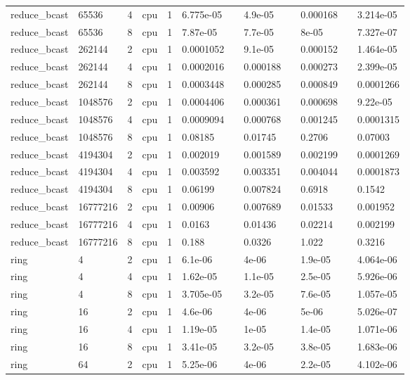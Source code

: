 \begin{tabular}{llllllllllll}
reduce\_bcast & 65536 & 4 & cpu & 1 & 6.775e-05 &  & 4.9e-05 &  & 0.000168 &  & 3.214e-05 \\
reduce\_bcast & 65536 & 8 & cpu & 1 & 7.87e-05 &  & 7.7e-05 &  & 8e-05 &  & 7.327e-07 \\
reduce\_bcast & 262144 & 2 & cpu & 1 & 0.0001052 &  & 9.1e-05 &  & 0.000152 &  & 1.464e-05 \\
reduce\_bcast & 262144 & 4 & cpu & 1 & 0.0002016 &  & 0.000188 &  & 0.000273 &  & 2.399e-05 \\
reduce\_bcast & 262144 & 8 & cpu & 1 & 0.0003448 &  & 0.000285 &  & 0.000849 &  & 0.0001266 \\
reduce\_bcast & 1048576 & 2 & cpu & 1 & 0.0004406 &  & 0.000361 &  & 0.000698 &  & 9.22e-05 \\
reduce\_bcast & 1048576 & 4 & cpu & 1 & 0.0009094 &  & 0.000768 &  & 0.001245 &  & 0.0001315 \\
reduce\_bcast & 1048576 & 8 & cpu & 1 & 0.08185 &  & 0.01745 &  & 0.2706 &  & 0.07003 \\
reduce\_bcast & 4194304 & 2 & cpu & 1 & 0.002019 &  & 0.001589 &  & 0.002199 &  & 0.0001269 \\
reduce\_bcast & 4194304 & 4 & cpu & 1 & 0.003592 &  & 0.003351 &  & 0.004044 &  & 0.0001873 \\
reduce\_bcast & 4194304 & 8 & cpu & 1 & 0.06199 &  & 0.007824 &  & 0.6918 &  & 0.1542 \\
reduce\_bcast & 16777216 & 2 & cpu & 1 & 0.00906 &  & 0.007689 &  & 0.01533 &  & 0.001952 \\
reduce\_bcast & 16777216 & 4 & cpu & 1 & 0.0163 &  & 0.01436 &  & 0.02214 &  & 0.002199 \\
reduce\_bcast & 16777216 & 8 & cpu & 1 & 0.188 &  & 0.0326 &  & 1.022 &  & 0.3216 \\
ring & 4 & 2 & cpu & 1 & 6.1e-06 &  & 4e-06 &  & 1.9e-05 &  & 4.064e-06 \\
ring & 4 & 4 & cpu & 1 & 1.62e-05 &  & 1.1e-05 &  & 2.5e-05 &  & 5.926e-06 \\
ring & 4 & 8 & cpu & 1 & 3.705e-05 &  & 3.2e-05 &  & 7.6e-05 &  & 1.057e-05 \\
ring & 16 & 2 & cpu & 1 & 4.6e-06 &  & 4e-06 &  & 5e-06 &  & 5.026e-07 \\
ring & 16 & 4 & cpu & 1 & 1.19e-05 &  & 1e-05 &  & 1.4e-05 &  & 1.071e-06 \\
ring & 16 & 8 & cpu & 1 & 3.41e-05 &  & 3.2e-05 &  & 3.8e-05 &  & 1.683e-06 \\
ring & 64 & 2 & cpu & 1 & 5.25e-06 &  & 4e-06 &  & 2.2e-05 &  & 4.102e-06 \\

\end{tabular}

